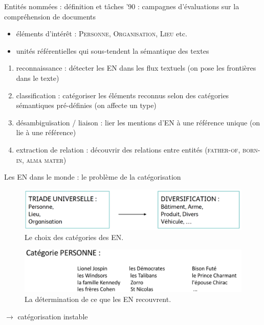 \documentclass[xetex,xcolor={table,usenames,dvipsnames}]{beamer}
\begin{document}
\begin{frame}{Entités nommées : définition et tâches}
	'90 : campagnes d'évaluations sur la compréhension de documents
	
	\begin{itemize}
		\item \textcolor{deepred}{éléments d'intérêt} : \textsc{Personne}, \textsc{Organisation}, \textsc{Lieu} etc.
		\item \textcolor{deepred}{unités référentielles} qui sous-tendent la sémantique des textes
	\end{itemize}
	
	\begin{enumerate}
		\item \textcolor{deepblue}{reconnaissance} : détecter les \textsc{EN} dans les flux textuels (on pose les frontières dans le texte)
		\item \textcolor{deepblue}{classification} : catégoriser les éléments reconnus selon des catégories sémantiques pré-définies (on affecte un type)
		\item \textcolor{deepblue}{désambiguïsation / liaison} : lier les mentions d'\textsc{EN} à une référence unique (on lie à une référence)
		\item \textcolor{deepblue}{extraction de relation} : découvrir des relations entre entités (\textsc{father-of}, \textsc{born-in}, \textsc{alma mater})
	\end{enumerate}
\end{frame}

\begin{frame}{Les \textsc{EN} dans le monde : le problème de la catégorisation}

			\begin{figure}[h] %
			\centering
			\includegraphics[width=1\linewidth]{img/categorisation.png}
			\caption{Le choix des catégories des \textsc{EN}.}
			\label{fig:ling_out_TAL}
		\end{figure}

					\begin{figure}[h] %
			\centering
			\includegraphics[width=1\linewidth]{img/couverture.png}
					\caption{La détermination de ce que les \textsc{EN} recouvrent.}
			\label{fig:ling_out_TAL}
		\end{figure}

	
	$\rightarrow$ \textcolor{deepred}{catégorisation instable}
\end{frame}
\end{document}
